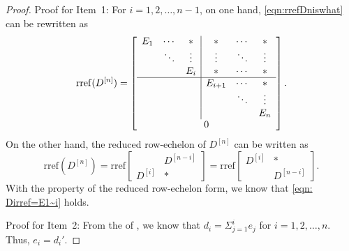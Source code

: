 \documentclass[sort&compress]{elsarticle}
\newcommand\rref{\mathrm{rref}}
\begin{document}
{\renewcommand\proofname{Proof for \Cref{thm: ei=d'i}}
\begin{proof}
Proof for Item~1:
For $i=1,2,\dots,n-1$, on one hand, \eqref{eqn:rrefDniswhat} can be rewritten as
\[
\rref(D^{[n]})
=\left[\begin{array}{ccc|ccc}
E_1&\cdots&*&*&\cdots&*\\
&\ddots&\vdots&\vdots&\ddots&\vdots\\
&&E_i&*&\cdots&*\\ \hline
&&&E_{i+1}&\cdots&*\\
&&&&\ddots&\vdots\\
&&&&&E_{n}\\
\multicolumn{6}{c}{0}
\end{array}\right].
\]
On the other hand, the reduced row-echelon of $D^{[n]}$ can be written as
\[
\rref(D^{[n]})
=\rref\begin{bmatrix}&D^{[n-i]}\\ D^{[i]}&*\end{bmatrix}
=\rref\begin{bmatrix}D^{[i]}&*\\ &D^{[n-i]}\end{bmatrix}.
\]
With the property of the reduced row-echelon form,
we know that \eqref{eqn: Dirref=E1~i} holds.

Proof for Item~2:
From the  of , we know that
$d_i=\Sigma_{j=1}^ie_j$ for $i=1,2,\dots,n$.
Thus, $e_i=d_i'$.


\end{proof}}
\end{document}
